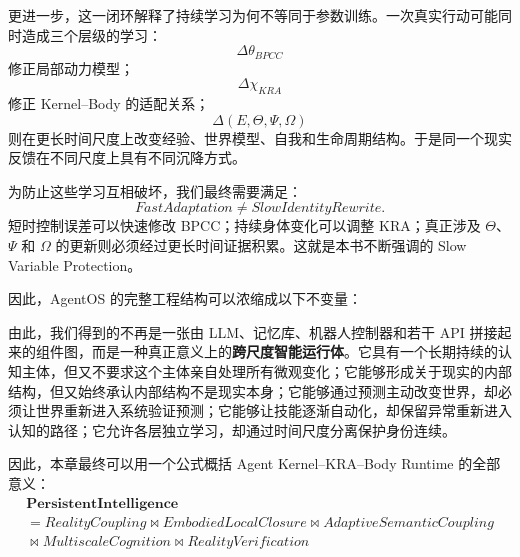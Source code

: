 更进一步，这一闭环解释了持续学习为何不等同于参数训练。一次真实行动可能同时造成三个层级的学习：
\[
\Delta\theta_{BPCC}
\]
修正局部动力模型；
\[
\Delta\chi_{KRA}
\]
修正 Kernel--Body 的适配关系；
\[
\Delta(E,\Theta,\Psi,\Omega)
\]
则在更长时间尺度上改变经验、世界模型、自我和生命周期结构。于是同一个现实反馈在不同尺度上具有不同沉降方式。

为防止这些学习互相破坏，我们最终需要满足：
\[
\boxed{
FastAdaptation
\neq
SlowIdentityRewrite .
}
\]
短时控制误差可以快速修改 BPCC；持续身体变化可以调整 KRA；真正涉及 $\Theta$、$\Psi$ 和 $\Omega$ 的更新则必须经过更长时间证据积累。这就是本书不断强调的 Slow Variable Protection。

因此，AgentOS 的完整工程结构可以浓缩成以下不变量：

\begin{statementbox}
\centering
{}
\end{statementbox}

由此，我们得到的不再是一张由 LLM、记忆库、机器人控制器和若干 API 拼接起来的组件图，而是一种真正意义上的\textbf{跨尺度智能运行体}。它具有一个长期持续的认知主体，但又不要求这个主体亲自处理所有微观变化；它能够形成关于现实的内部结构，但又始终承认内部结构不是现实本身；它能够通过预测主动改变世界，却必须让世界重新进入系统验证预测；它能够让技能逐渐自动化，却保留异常重新进入认知的路径；它允许各层独立学习，却通过时间尺度分离保护身份连续。

因此，本章最终可以用一个公式概括 Agent Kernel--KRA--Body Runtime 的全部意义：
\[
\boxed{
\begin{gathered}
\textbf{PersistentIntelligence}\\[2pt]
= RealityCoupling
\bowtie EmbodiedLocalClosure
\bowtie AdaptiveSemanticCoupling\\
{}\bowtie MultiscaleCognition
\bowtie RealityVerification
\end{gathered}
}
\]

